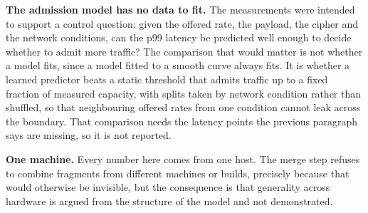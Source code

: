 \noindent\textbf{The admission model has no data to fit.}
The measurements were intended to support a control question: given the offered
rate, the payload, the cipher and the network conditions, can the p99 latency be
predicted well enough to decide whether to admit more traffic? The comparison
that would matter is not whether a model fits, since a model fitted to a smooth
curve always fits. It is whether a learned predictor beats a static threshold
that admits traffic up to a fixed fraction of measured capacity, with splits
taken by network condition rather than shuffled, so that neighbouring offered
rates from one condition cannot leak across the boundary. That comparison needs
the latency points the previous paragraph says are missing, so it is not
reported.

\noindent\textbf{One machine.}
Every number here comes from one host. The merge step refuses to combine
fragments from different machines or builds, precisely because that would
otherwise be invisible, but the consequence is that generality across hardware
is argued from the structure of the model and not demonstrated.
